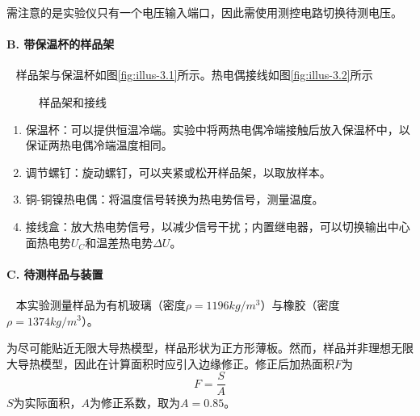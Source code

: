\documentclass[10pt,a4paper,twocolumn,twoside,UTF8]{ctexart}
\begin{document}
	需注意的是实验仪只有一个电压输入端口，因此需使用测控电路切换待测电压。

	\paragraph{B. 带保温杯的样品架}~
	\newline 
	\indent
	样品架与保温杯如图\ref{fig:illus-3.1}所示。热电偶接线如图\ref{fig:illus-3.2}所示

	\begin{figure}[htbp]
		\centering
		\caption{样品架和接线}
	\end{figure}

	\begin{enumerate}[label=\arabic*.]
		\item 保温杯：可以提供恒温冷端。实验中将两热电偶冷端接触后放入保温杯中，以保证两热电偶冷端温度相同。
		\item 调节螺钉：旋动螺钉，可以夹紧或松开样品架，以取放样本。
		\item 铜-铜镍热电偶：将温度信号转换为热电势信号，测量温度。
		\item 接线盒：放大热电势信号，以减少信号干扰；内置继电器，可以切换输出中心面热电势$U_C$和温差热电势$\Delta U$。
	\end{enumerate}
	
	\paragraph{C. 待测样品与装置}~
	\newline 
	\indent
	本实验测量样品为有机玻璃（密度$\rho = 1196 kg/m^3$）与橡胶（密度$\rho = 1374 kg/m^3$）。

	为尽可能贴近无限大导热模型，样品形状为正方形薄板。然而，样品并非理想无限大导热模型，因此在计算面积时应引入边缘修正。修正后加热面积$F$为
	\begin{equation}
		F = \frac{S}{A} \label{eq:2}
	\end{equation}
	$S$为实际面积，$A$为修正系数，取为$A=0.85$。
\end{document}
